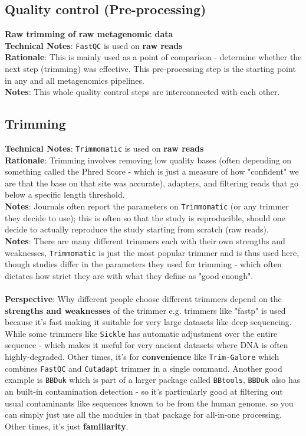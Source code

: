 \documentclass[11pt]{report}
\begin{document}
\subsection{Quality control (Pre-processing)}		

\textbf{Raw trimming of raw metagenomic data} 
\\ \textbf{Technical Notes}: \texttt{FastQC} is used on \textbf{raw reads}
\\ \textbf{Rationale}: This is mainly used as a point of comparison - determine whether the next step (trimming) was effective. This pre-processing step is the starting point in any and all metagenomics pipelines. 
\\ \textbf{Notes}: This whole quality control steps are interconnected with each other. 
\subsection{Trimming} 
\textbf{Technical Notes}: \texttt{Trimmomatic} is used on \textbf{raw reads}
\\ \textbf{Rationale}: Trimming involves removing low quality bases (often depending on something called the Phred Score - which is just a measure of how "confident" we are that the base on that site was accurate), adapters, and filtering reads that go below a specific length threshold. 
\\ \textbf{Notes}: Journals often report the parameters on \texttt{Trimmomatic} (or any trimmer they decide to use); this is often so that the study is reproducible, should one decide to actually reproduce the study starting from scratch (raw reads). 
\\ \textbf{Notes}: There are many different trimmers each with their own strengths and weaknesses, \texttt{Trimmomatic} is just the most popular trimmer and is thus used here, though studies differ in the parameters they used for trimming - which often dictates how strict they are with what they define as "good enough". \\
\\ \textbf{Perspective}: Why different people choose different trimmers depend on the \textbf{strengths and weaknesses} of the trimmer e.g. trimmers like "fastp" is used because it's fast making it suitable for very large datasets like deep sequencing. While some trimmers like \texttt{Sickle} has automatic adjustment over the entire sequence - which makes it useful for very ancient datasets where DNA is often highly-degraded. Other times, it's for \textbf{convenience} like \texttt{Trim-Galore} which combines \texttt{FastQC} and \texttt{Cutadapt} trimmer in a single command. Another good example is \texttt{BBDuk} which is part of a larger package called \texttt{BBtools}, \texttt{BBDuk} also has an built-in contamination detection - so it's particularly good at filtering out usual contaminants like sequences known to be from the human genome. so you can simply just use all the modules in that package for all-in-one processing.  Other times, it's just \textbf{familiarity}. 
\end{document}
